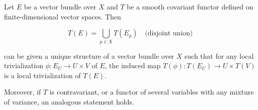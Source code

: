 Let $E$ be a vector bundle over $X$ and $T$ be a smooth covariant functor defined on finite-dimensional vector spaces. Then

$$T(E) = \bigcup_{p \in X} T(E_p) \quad \text{(disjoint union)}$$

can be given a unique structure of a vector bundle over $X$ such that for any local trivialization $\phi: E_U \to U \times V$ of $E$, the induced map $T(\phi): T(E_U) \to U \times T(V)$ is a local trivialization of $T(E)$.

Moreover, if $T$ is contravariant, or a functor of several variables with any mixture of variance, an analogous statement holds.
